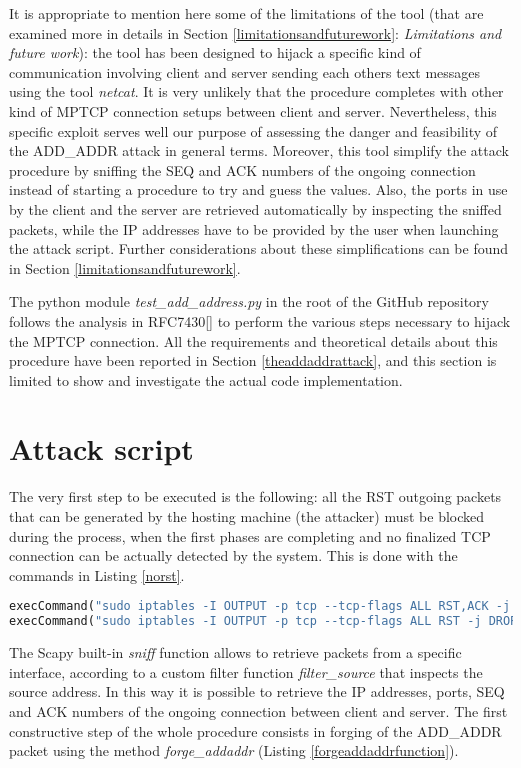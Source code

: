 It is appropriate to mention here some of the limitations of the tool (that are examined more in details in Section \ref{limitationsandfuturework}: \textit{Limitations and future work}): the tool has been designed to hijack a specific kind of communication involving client and server sending each others text messages using the tool \textit{netcat}. It is very unlikely that the procedure completes with other kind of MPTCP connection setups between client and server. Nevertheless, this specific exploit serves well our purpose of assessing the danger and feasibility of the ADD\_ADDR attack in general terms.
Moreover, this tool simplify the attack procedure by sniffing the SEQ and ACK numbers of the ongoing connection instead of starting a procedure to try and guess the values. Also, the ports in use by the client and the server are retrieved automatically by inspecting the sniffed packets, while the IP addresses have to be provided by the user when launching the attack script. Further considerations about these simplifications can be found in Section \ref{limitationsandfuturework}.

The python module \textit{test\_add\_address.py} in the root of the GitHub repository follows the analysis in RFC7430[] to perform the various steps necessary to hijack the MPTCP connection. All the requirements and theoretical details about this procedure have been reported in Section \ref{theaddaddrattack}, and this section is limited to show and investigate the actual code implementation.

\section{Attack script}
The very first step to be executed is the following: all the RST outgoing packets that can be generated by the hosting machine (the attacker) must be blocked during the process, when the first phases are completing and no finalized TCP connection can be actually detected by the system. This is done with the commands in Listing \ref{norst}.


\begin{lstlisting}[language=python, caption=\textit{Disable RST outgoing packets}, label=norst]
execCommand("sudo iptables -I OUTPUT -p tcp --tcp-flags ALL RST,ACK -j DROP", shell = True)
execCommand("sudo iptables -I OUTPUT -p tcp --tcp-flags ALL RST -j DROP", shell = True)
\end{lstlisting}

The Scapy built-in \textit{sniff} function allows to retrieve packets from a specific interface, according to a custom filter function \textit{filter\_source} that inspects the source address. In this way it is possible to retrieve the IP addresses, ports, SEQ and ACK numbers of the ongoing connection between client and server.
The first constructive step of the whole procedure consists in forging of the ADD\_ADDR packet using the method \textit{forge\_addaddr} (Listing \ref{forgeaddaddrfunction}).

